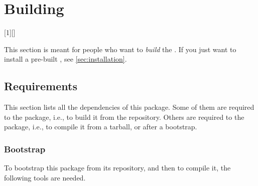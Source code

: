 
\chapter{Building \usdk}
\label{sec:build}

[1][]
  {%
    }
  {\cxxPost}

This section is meant for people who want to \emph{build} the \usdk.  If
you just want to install a pre-built \usdk, see \autoref{sec:installation}.

\section{Requirements}
\label{sec:build:req}

This section lists all the dependencies of this package.  Some of them are
required to  the package, i.e., to build it from the
repository.  Others are required to  the package, i.e., to
compile it from a tarball, or after a bootstrap.

\subsection{Bootstrap}

To bootstrap this package from its repository, and then to compile it,
the following tools are needed.

